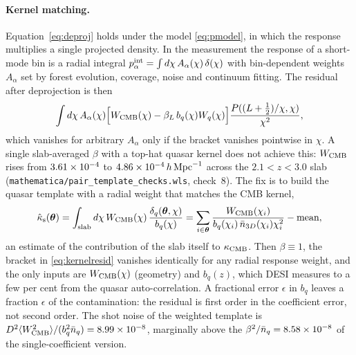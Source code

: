 \documentclass[11pt,a4paper]{article}
\newcommand{\vth}{\bm{\theta}}
\newcommand{\kcmb}{\kappa_{\rm CMB}}
\begin{document}
\paragraph{Kernel matching.}
Equation~\eqref{eq:deproj} holds under the model \eqref{eq:pmodel}, in which the response multiplies a single projected density. In the measurement the response of a short-mode bin is a radial integral $p^{\rm int}_\alpha=\int d\chi\,A_\alpha(\chi)\,\delta(\chi)$ with bin-dependent weights $A_\alpha$ set by forest evolution, coverage, noise and continuum fitting. The residual after deprojection is then
\begin{equation}
\int d\chi\,A_\alpha(\chi)\Big[W_{\rm CMB}(\chi)-\beta_L\,b_q(\chi)W_q(\chi)\Big]\frac{P((L+\frac12)/\chi,\chi)}{\chi^2},
\label{eq:kernelresid}
\end{equation}
which vanishes for arbitrary $A_\alpha$ only if the bracket vanishes pointwise in $\chi$. A single slab-averaged $\beta$ with a top-hat quasar kernel does not achieve this: $W_{\rm CMB}$ rises from $3.61\times10^{-4}$ to $4.86\times10^{-4}\,h\,{\rm Mpc}^{-1}$ across the $2.1<z<3.0$ slab (\texttt{mathematica/pair\_template\_checks.wls}, check~8). The fix is to build the quasar template with a radial weight that matches the CMB kernel,
\begin{equation}
\hat\kappa_{\rm s}(\vth)=\int_{\rm slab}d\chi\,W_{\rm CMB}(\chi)\,\frac{\delta_q(\vth,\chi)}{b_q(\chi)}
=\sum_{i\in\vth}\frac{W_{\rm CMB}(\chi_i)}{b_q(\chi_i)\,\bar n_{3D}(\chi_i)\chi_i^2}-\text{mean},
\label{eq:matched}
\end{equation}
an estimate of the contribution of the slab itself to $\kcmb$. Then $\beta\equiv1$, the bracket in \eqref{eq:kernelresid} vanishes identically for any radial response weight, and the only inputs are $W_{\rm CMB}(\chi)$ (geometry) and $b_q(z)$, which DESI measures to a few per cent from the quasar auto-correlation. A fractional error $\epsilon$ in $b_q$ leaves a fraction $\epsilon$ of the contamination: the residual is first order in the coefficient error, not second order. The shot noise of the weighted template is $D^2\langle W_{\rm CMB}^2\rangle/(b_q^2\bar n_q)=8.99\times10^{-8}$, marginally above the $\beta^2/\bar n_q=8.58\times10^{-8}$ of the single-coefficient version.
\end{document}
